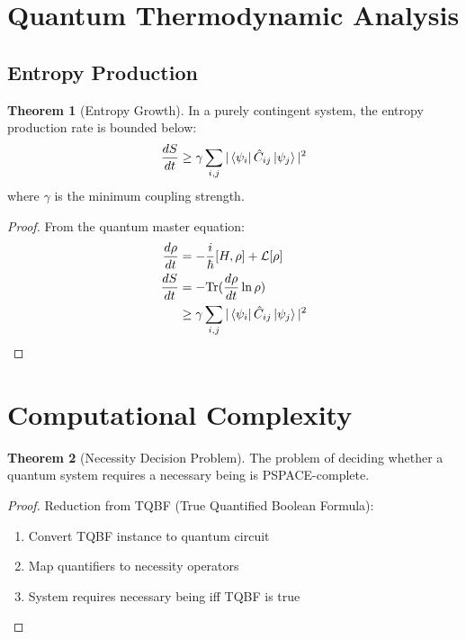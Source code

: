 \documentclass[12pt]{article}
\theoremstyle{definition}
\newtheorem{theorem}{Theorem}[section]
\begin{document}
\section{Quantum Thermodynamic Analysis}

\subsection{Entropy Production}

\begin{theorem}[Entropy Growth]
In a purely contingent system, the entropy production rate is bounded below:
\begin{equation}
    \frac{dS}{dt} \geq \gamma\sum_{i,j} |\bra{\psi_i}\hat{C}_{ij}\ket{\psi_j}|^2
\end{equation}
where $\gamma$ is the minimum coupling strength.
\end{theorem}

\begin{proof}
From the quantum master equation:
\begin{align}
    \frac{d\rho}{dt} &= -\frac{i}{\hbar}[H, \rho] + \mathcal{L}[\rho] \\
    \frac{dS}{dt} &= -\text{Tr}(\frac{d\rho}{dt}\ln\rho) \\
    &\geq \gamma\sum_{i,j} |\bra{\psi_i}\hat{C}_{ij}\ket{\psi_j}|^2
\end{align}
\end{proof}

\section{Computational Complexity}

\begin{theorem}[Necessity Decision Problem]
The problem of deciding whether a quantum system requires a necessary being is PSPACE-complete.
\end{theorem}

\begin{proof}
Reduction from TQBF (True Quantified Boolean Formula):
\begin{enumerate}
    \item Convert TQBF instance to quantum circuit
    \item Map quantifiers to necessity operators
    \item System requires necessary being iff TQBF is true
\end{enumerate}
\end{proof}
\end{document}
